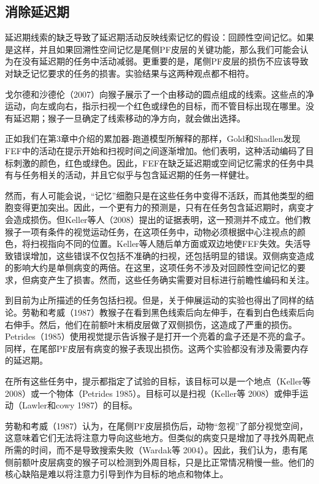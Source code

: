 \subsection{消除延迟期}
延迟期线索的缺乏导致了延迟期活动反映线索记忆的假设：回顾性空间记忆。如果是这样，并且如果回溯性空间记忆是尾侧PF皮层的关键功能，那么我们可能会认为在没有延迟期的任务中活动减弱。更重要的是，尾侧PF皮层的损伤不应该导致对缺乏记忆要求的任务的损害。实验结果与这两种观点都不相符。

戈尔德和沙德伦（2007）向猴子展示了一个由移动的圆点组成的线索。这些点的净运动，向左或向右，指示扫视一个红色或绿色的目标，而不管目标出现在哪里。没有延迟期；猴子一旦确定了线索移动的净方向，就会做出选择。

正如我们在第3章中介绍的累加器-跑道模型所解释的那样，Gold和Shadlen发现FEF中的活动在提示开始和扫视时间之间逐渐增加。他们表明，这种活动编码了目标刺激的颜色，红色或绿色。因此，FEF在缺乏延迟期或空间记忆需求的任务中具有与任务相关的活动，并且它似乎与包含延迟期的任务一样健壮。

然而，有人可能会说，“记忆”细胞只是在这些任务中变得不活跃，而其他类型的细胞变得更加突出。因此，一个更有力的预测是，只有在任务包含延迟期时，病变才会造成损伤。但Keller等人（2008）提出的证据表明，这一预测并不成立。他们教猴子一项有条件的视觉运动任务，在这项任务中，动物必须根据中心注视点的颜色，将扫视指向不同的位置。Keller等人随后单方面或双边地使FEF失效。失活导致错误增加，这些错误不仅包括不准确的扫视，还包括明显的错误。双侧病变造成的影响大约是单侧病变的两倍。在这里，这项任务不涉及对回顾性空间记忆的要求，但病变产生了损害。然而，这些任务确实需要对目标进行前瞻性编码和关注。

到目前为止所描述的任务包括扫视。但是，关于伸展运动的实验也得出了同样的结论。劳勒和考威（1987）教猴子在看到黑色线索后向左伸手，在看到白色线索后向右伸手。然后，他们在前额叶末梢皮层做了双侧损伤，这造成了严重的损伤。Petrides（1985）使用视觉提示告诉猴子是打开一个亮着的盒子还是不亮的盒子。同样，在尾部PF皮层有病变的猴子表现出损伤。这两个实验都没有涉及需要内存的延迟期。

在所有这些任务中，提示都指定了试验的目标，该目标可以是一个地点（Keller等 2008）或一个物体（Petrides 1985）。目标可以是扫视（Keller等 2008）或伸手运动（Lawler和cowy 1987）的目标。

劳勒和考威（1987）认为，在尾侧PF皮层损伤后，动物“忽视”了部分视觉空间，这意味着它们无法将注意力导向这些地方。但类似的病变只是增加了寻找外周靶点所需的时间，而不是导致搜索失败（Wardak等 2004）。因此，我们认为，患有尾侧前额叶皮层病变的猴子可以检测到外周目标，只是比正常情况稍慢一些。他们的核心缺陷是难以将注意力引导到作为目标的地点和物体上。
